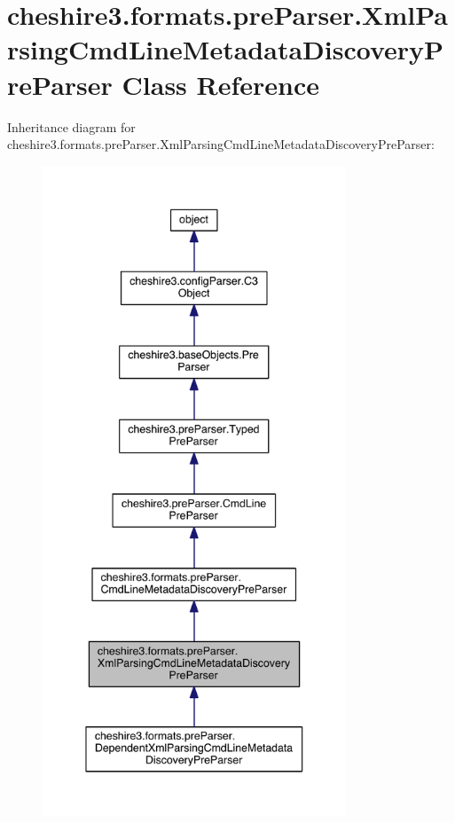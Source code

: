 \hypertarget{classcheshire3_1_1formats_1_1pre_parser_1_1_xml_parsing_cmd_line_metadata_discovery_pre_parser}{\section{cheshire3.\-formats.\-pre\-Parser.\-Xml\-Parsing\-Cmd\-Line\-Metadata\-Discovery\-Pre\-Parser Class Reference}
\label{classcheshire3_1_1formats_1_1pre_parser_1_1_xml_parsing_cmd_line_metadata_discovery_pre_parser}
}


Inheritance diagram for cheshire3.\-formats.\-pre\-Parser.\-Xml\-Parsing\-Cmd\-Line\-Metadata\-Discovery\-Pre\-Parser\-:
\nopagebreak
\begin{figure}[H]
\begin{center}
\leavevmode
\includegraphics[height=550pt]{classcheshire3_1_1formats_1_1pre_parser_1_1_xml_parsing_cmd_line_metadata_discovery_pre_parser__inherit__graph}
\end{center}
\end{figure}


